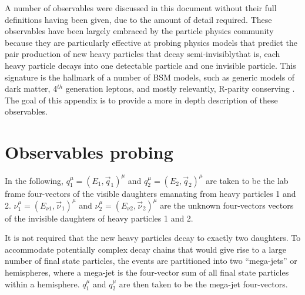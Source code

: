 
A number of observables were discussed in this document without their full definitions having been given, due to the amount of detail required. These observables have been largely embraced by the particle physics community because they are particularly effective at probing physics models that predict the pair production of new heavy particles that decay semi-invisibly\textemdash that is, each heavy particle decays into one detectable particle and one invisible particle. This signature is the hallmark of a number of BSM models, such as generic models of dark matter, 4$^{th}$ generation leptons, and mostly relevantly, R-parity conserving \SUSY. The goal of this appendix is to provide a more in depth description of these observables. 

\section{Observables probing \SUSY}

In the following, $q_1 ^\mu=(E_1, \vec{q}_1)^\mu$ and $q_2 ^\mu=(E_2, \vec{q}_2) ^\mu$ are taken to be the lab frame four-vectors of the visible daughters emanating from heavy particles 1 and 2. $\nu_1 ^\mu=(E_{\nu1}, \vec{\nu}_1)^\mu$ and $\nu_2 ^\mu=(E_{\nu2}, \vec{\nu}_2) ^\mu$ are the unknown four-vectors vectors of the invisible daughters of heavy particles 1 and 2. 

It is not required that the new heavy particles decay to exactly two daughters. To accommodate potentially complex decay chains that would give rise to a large number of final state particles, the events are partitioned into two ``mega-jets''\cite{Aad:2012naa} or hemispheres, where a mega-jet is the four-vector sum of all final state particles within a hemisphere. $q_1 ^\mu$ and $q_2 ^\mu$ are then taken to be the mega-jet four-vectors. 


